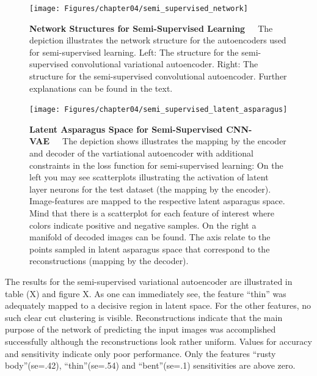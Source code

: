 \begin{figure}[h]
	\centering
	\texttt{[image: Figures/chapter04/semi\_supervised\_network]}
	\decoRule
	\caption[Network Structures for Semi-Supervised Learning]{\textbf{Network Structures for Semi-Supervised Learning}~~~The depiction illustrates the network structure for the autoencoders used for semi-supervised learning. Left: The structure for the semi-supervised convolutional variational autoencoder. Right: The structure for the semi-supervised convolutional autoencoder. Further explanations can be found in the text.}
	\label{fig:SemiSupervisedNetworkStructures}
\end{figure}

\begin{figure}[h]
	\centering
	\texttt{[image: Figures/chapter04/semi\_supervised\_latent\_asparagus]}
	\decoRule
	\caption[Latent Asparagus Space for Semi-Supervised CNN-VAE]{\textbf{Latent Asparagus Space for Semi-Supervised CNN-VAE}~~~The depiction shows illustrates the mapping by the encoder and decoder of the vartiational autoencoder with additional constraints in the loss function for semi-supervised learning: On the left you may see scatterplots illustrating the activation of latent layer neurons for the test dataset (the mapping by the encoder). Image-features are mapped to the respective latent asparagus space. Mind that there is a scatterplot for each feature of interest where colors indicate positive and negative samples. On the right a manifold of decoded images can be found. The axis relate to the points sampled in latent asparagus space that correspond to the reconstructions (mapping by the decoder).}
	\label{fig:SemiSupervisedLatentSpace}
\end{figure}


The results for the semi-supervised variational autoencoder are illustrated in table (X) and figure X. As one can immediately see, the feature “thin” was adequately mapped to a decisive region in latent space. For the other features, no such clear cut clustering is visible. Reconstructions indicate that the main purpose of the network of predicting the input images was accomplished successfully although the reconstructions look rather uniform. Values for accuracy and sensitivity indicate only poor performance. Only the features “rusty body”(se=.42), “thin”(se=.54) and “bent”(se=.1) sensitivities are above zero. \\


